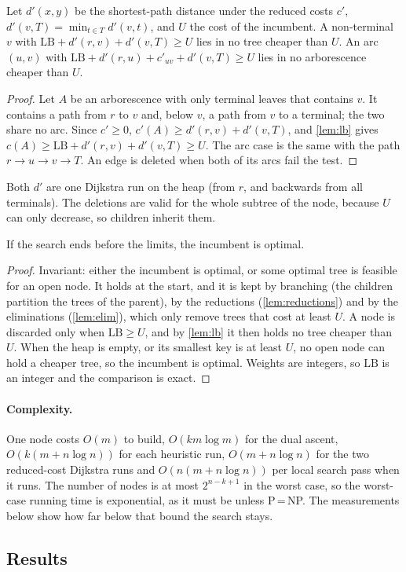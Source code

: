 \begin{lemma}\label{lem:elim}
Let \(d'(x,y)\) be the shortest-path distance under the reduced costs \(c'\), \(d'(v,T)=\min_{t\in T}d'(v,t)\), and \(U\) the cost of
the incumbent. A non-terminal \(v\) with \(\mathrm{LB}+d'(r,v)+d'(v,T)\ge U\) lies in no tree cheaper than \(U\). An arc
\((u,v)\) with \(\mathrm{LB}+d'(r,u)+c'_{uv}+d'(v,T)\ge U\) lies in no arborescence cheaper than \(U\).
\end{lemma}
\begin{proof}
Let \(A\) be an arborescence with only terminal leaves that contains \(v\). It contains a path from \(r\) to \(v\) and, below \(v\), a path
from \(v\) to a terminal; the two share no arc. Since \(c'\ge0\), \(c'(A)\ge d'(r,v)+d'(v,T)\), and \cref{lem:lb} gives
\(c(A)\ge\mathrm{LB}+d'(r,v)+d'(v,T)\ge U\). The arc case is the same with the path \(r\to u\to v\to T\). An edge is deleted when
both of its arcs fail the test.
\end{proof}
\noindent Both \(d'\) are one Dijkstra run on the heap (from \(r\), and backwards from all terminals). The deletions are valid for the
whole subtree of the node, because \(U\) can only decrease, so children inherit them.

\begin{theorem}\label{thm:bnb}
If the search ends before the limits, the incumbent is optimal.
\end{theorem}
\begin{proof}
Invariant: either the incumbent is optimal, or some optimal tree is feasible for an open node. It holds at the start, and it is kept by
branching (the children partition the trees of the parent), by the reductions (\cref{lem:reductions}) and by the eliminations
(\cref{lem:elim}), which only remove trees that cost at least \(U\). A node is discarded only when \(\mathrm{LB}\ge U\), and by
\cref{lem:lb} it then holds no tree cheaper than \(U\). When the heap is empty, or its smallest key is at least \(U\), no open node can
hold a cheaper tree, so the incumbent is optimal. Weights are integers, so \(\mathrm{LB}\) is an integer and the comparison is exact.
\end{proof}

\paragraph{Complexity.} One node costs \(O(m)\) to build, \(O(km\log m)\) for the dual ascent, \(O(k(m+n\log n))\) for each heuristic run,
\(O(m+n\log n)\) for the two reduced-cost Dijkstra runs and \(O(n(m+n\log n))\) per local search pass when it runs. The number of nodes is
at most \(2^{n-k+1}\) in the worst case, so the worst-case running time is exponential, as it must be unless P\,=\,NP. The
measurements below show how far below that bound the search stays.

\subsection{Results}


